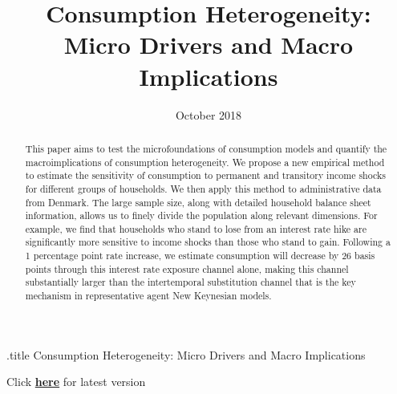 \documentclass[titlepage]{\econtex}\newcommand{\texname}{ConsumptionHeterogeneity}
\begin{document}


%
\begin{verbatimwrite}{\jobname.title}
Consumption Heterogeneity: Micro Drivers and Macro Implications
\end{verbatimwrite}


\title{ 
	\bigskip
	\bigskip
	Consumption Heterogeneity: \\ Micro Drivers and Macro Implications}



\date{October 2018}
\maketitle

\begin{center}
Click \href{http://www.econ2.jhu.edu/jobmarket/2018/CrawleyES/JobPaper/JobPaperCrawleyES.pdf}{\textbf{here}} for latest version
\end{center}

\begin{abstract}
	This paper aims to test the microfoundations of consumption models and quantify the macroimplications of consumption heterogeneity. We propose a new empirical method to estimate the sensitivity of consumption to permanent and transitory income shocks for different groups of households. We then apply this method to administrative data from Denmark. The large sample size, along with detailed household balance sheet information, allows us to finely divide the population along relevant dimensions. For example, we find that households who stand to lose from an interest rate hike are significantly more sensitive to income shocks than those who stand to gain. Following a 1 percentage point rate increase, we estimate consumption will decrease by 26 basis points through this interest rate exposure channel alone, making this channel substantially larger than the intertemporal substitution channel that is the key mechanism in representative agent New Keynesian models.
%  
\end{abstract}
\end{document}

